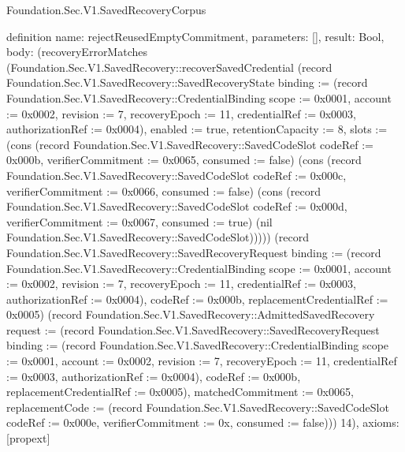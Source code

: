 \begin{lexlean}{Foundation.Sec.V1.SavedRecoveryCorpus}
\begin{semanticmodule}
definition{
  name: rejectReusedEmptyCommitment,
  parameters: [],
  result: Bool,
  body: (recoveryErrorMatches (Foundation.Sec.V1.SavedRecovery::recoverSavedCredential (record Foundation.Sec.V1.SavedRecovery::SavedRecoveryState {binding := (record Foundation.Sec.V1.SavedRecovery::CredentialBinding {scope := 0x0001, account := 0x0002, revision := 7, recoveryEpoch := 11, credentialRef := 0x0003, authorizationRef := 0x0004}), enabled := true, retentionCapacity := 8, slots := (cons (record Foundation.Sec.V1.SavedRecovery::SavedCodeSlot {codeRef := 0x000b, verifierCommitment := 0x0065, consumed := false}) (cons (record Foundation.Sec.V1.SavedRecovery::SavedCodeSlot {codeRef := 0x000c, verifierCommitment := 0x0066, consumed := false}) (cons (record Foundation.Sec.V1.SavedRecovery::SavedCodeSlot {codeRef := 0x000d, verifierCommitment := 0x0067, consumed := true}) (nil Foundation.Sec.V1.SavedRecovery::SavedCodeSlot))))}) (record Foundation.Sec.V1.SavedRecovery::SavedRecoveryRequest {binding := (record Foundation.Sec.V1.SavedRecovery::CredentialBinding {scope := 0x0001, account := 0x0002, revision := 7, recoveryEpoch := 11, credentialRef := 0x0003, authorizationRef := 0x0004}), codeRef := 0x000b, replacementCredentialRef := 0x0005}) (record Foundation.Sec.V1.SavedRecovery::AdmittedSavedRecovery {request := (record Foundation.Sec.V1.SavedRecovery::SavedRecoveryRequest {binding := (record Foundation.Sec.V1.SavedRecovery::CredentialBinding {scope := 0x0001, account := 0x0002, revision := 7, recoveryEpoch := 11, credentialRef := 0x0003, authorizationRef := 0x0004}), codeRef := 0x000b, replacementCredentialRef := 0x0005}), matchedCommitment := 0x0065, replacementCode := (record Foundation.Sec.V1.SavedRecovery::SavedCodeSlot {codeRef := 0x000e, verifierCommitment := 0x, consumed := false})})) 14),
  axioms: [propext]
}


\end{semanticmodule}
\end{lexlean}

